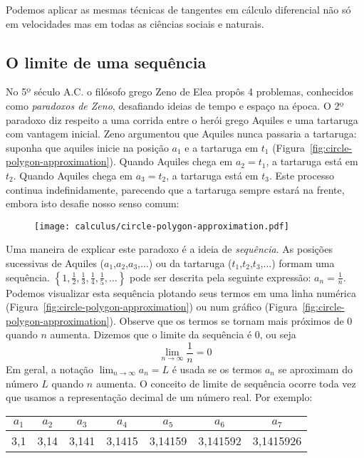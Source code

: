 Podemos aplicar as mesmas técnicas de tangentes em cálculo diferencial não só em velocidades mas em todas as ciências sociais e naturais.

\subsection{O limite de uma sequência}
No 5º século A.C. o filósofo grego Zeno de Elea propôs 4 problemas, conhecidos como \emph{paradoxos de Zeno}, desafiando ideias de tempo e espaço na época. O 2º paradoxo diz respeito a uma corrida entre o herói grego Aquiles e uma tartaruga com vantagem inicial. Zeno argumentou que Aquiles nunca passaria a tartaruga: suponha que aquiles inicie na posição $a_1$ e a tartaruga em $t_1$ (Figura~\ref{fig:circle-polygon-approximation}). Quando Aquiles chega em $a_2 = t_1$, a tartaruga está em $t_2$. Quando Aquiles chega em $a_3=t_2$, a tartaruga está em $t_3$. Este processo continua indefinidamente, parecendo que a tartaruga sempre estará na frente, embora isto desafie nosso senso comum:
\begin{figure}[!ht]
  \centering
  \texttt{[image: calculus/circle-polygon-approximation.pdf]}
\end{figure}

\noindent Uma maneira de explicar este paradoxo é a ideia de \emph{sequência}. As posições sucessivas de Aquiles ($a_1$,$a_2$,$a_3$,$\dots$) ou da tartaruga ($t_1$,$t_2$,$t_3$,$\dots$) formam uma sequência. $\left\{1,\frac{1}{2},\frac{1}{3},\frac{1}{4},\frac{1}{5},\dots\right\}$ pode ser descrita pela seguinte expressão: $a_n=\frac{1}{n}$. Podemos visualizar esta sequência plotando seus termos em uma linha numérica (Figura~\ref{fig:circle-polygon-approximation}) ou num gráfico (Figura~\ref{fig:circle-polygon-approximation}). Observe que os termos se tornam mais próximos de 0 quando $n$ aumenta. Dizemos que o limite da sequência é 0, ou seja $$\lim_{n\rightarrow\infty}\frac{1}{n}=0$$
Em geral, a notação $\lim_{n\rightarrow\infty}a_n=L$ é usada se os termos $a_n$ se aproximam do número $L$ quando $n$ aumenta.
O conceito de limite de sequência ocorre toda vez que usamos a representação decimal de um número real. Por exemplo:
\begin{table}[!ht]
  \centering
  \setlength\tabcolsep{0.15cm}
  \begin{tabular}{|c|c|c|c|c|c|c|}\hline
    $a_1$&$a_2$&$a_3$&$a_4$&$a_5$&$a_6$&$a_7$\\\hline
    3,1&3,14&3,141&3,1415&3,14159&3,141592&3,1415926\\\hline
  \end{tabular}
\end{table}

